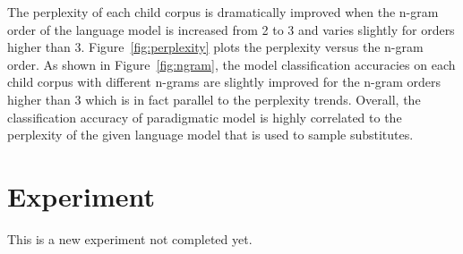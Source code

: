 The perplexity of each child corpus is dramatically improved when the n-gram
order of the language model is increased from 2 to 3 and varies slightly for
orders higher than 3.  Figure~\ref{fig:perplexity} plots the perplexity versus
the n-gram order.  As shown in Figure~\ref{fig:ngram}, the model classification
accuracies on each child corpus with different n-grams are slightly improved
for the n-gram orders higher than 3 which is in fact parallel to the perplexity
trends.  Overall, the classification accuracy of paradigmatic model is highly
correlated to the perplexity of the given language model that is used to sample
substitutes.

\section{Experiment }
\label{s:exp4}
This is a new experiment not completed yet.
